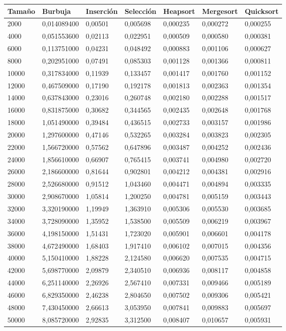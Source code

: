 \documentclass[a4paper, 11pt]{article}
\begin{document}
\begin{tabular}{|l|l|l|l|l|l|l|}
	\hline
	Tamaño	&Burbuja&	Inserción&	Selección&	Heapsort&	Mergesort&	Quicksort\\
	\hline
	\hline
	2000&	0,014089400&	0,00501	&0,005698&	0,000235&	0,000272&	0,000255\\
	\hline
	4000&	0,051553600&	0,02113	&0,022951&	0,000509&	0,000580&	0,000381\\
	\hline
	6000&	0,113751000&	0,04231&	0,048492&	0,000883&	0,001106&	0,000627\\
	\hline
	8000&	0,202951000&	0,07491&	0,085303&	0,001128&	0,001366&	0,000811\\
	\hline
	10000&	0,317834000&	0,11939&	0,133457&	0,001417&	0,001760&	0,001152\\
	\hline
	12000&	0,467509000&	0,17190&	0,192178&	0,001813&	0,002363&	0,001354\\
	\hline
	14000&	0,637843000&	0,23016&	0,260748&	0,002180&	0,002288&	0,001517\\
	\hline
	16000&	0,831875000&	0,30682&	0,344565&	0,002435&	0,002648&	0,001768\\
	\hline
	18000&	1,051490000&	0,39484&	0,436515&	0,002733&	0,003157&	0,001986\\
	\hline
	20000&	1,297600000&	0,47146&	0,532265&	0,003284&	0,003823&	0,002305\\
	\hline
	22000&	1,566720000&	0,57562&	0,647896&	0,003487&	0,004252&	0,002436\\
	\hline
	24000&	1,856610000&	0,66907&	0,765415&	0,003741&	0,004980&	0,002720\\
	\hline
	26000&	2,186600000&	0,81644&	0,902801&	0,004212&	0,004381&	0,002916\\
	\hline
	28000&	2,526680000&	0,91512&	1,043460&	0,004471&	0,004894&	0,003335\\
	\hline
	30000&	2,908670000&	1,05814&	1,200250&	0,004781&	0,005159&	0,003443\\
	\hline
	32000&	3,320190000&	1,19949&	1,363910&	0,005306&	0,005530&	0,003685\\
	\hline
	34000&	3,728090000&	1,35952&	1,538500&	0,005509&	0,006219&	0,003967\\
	\hline
	36000&	4,198150000&	1,51431&	1,723020&	0,005901&	0,006601&	0,004178\\
	\hline
	38000&	4,672490000&	1,68403&	1,917410&	0,006102&	0,007015&	0,004356\\
	\hline
	40000&	5,150410000&	1,88228&	2,124580&	0,006620&	0,007535&	0,004715\\
	\hline
	42000&	5,698770000&	2,09879&	2,340510&	0,006936&	0,008117&	0,004858\\
	\hline
	44000&	6,251140000&	2,26926&	2,567410&	0,007331&	0,009466&	0,005189\\
	\hline
	46000&	6,829350000&	2,46238&	2,804650&	0,007502&	0,009306&	0,005421\\
	\hline
	48000&	7,430450000&	2,66613&	3,053950&	0,007841&	0,009883&	0,005697\\
	\hline
	50000&	8,085720000&	2,92835&	3,312500&	0,008407&	0,010657&	0,005931\\
	\hline
\end{tabular}
\end{document}
